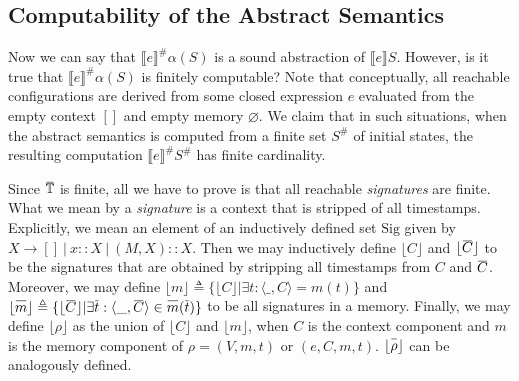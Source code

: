 \documentclass{article}
\theoremstyle{definition}
\def\ovbarw{1.2mu}
\def\ovbarh{1}
\newcommand*{\ovbar}[1]{\mkern \ovbarw\overline{\mkern-\ovbarw{\smash{#1}\scalebox{1}[\ovbarh]{\vphantom{i}}}\mkern-\ovbarw}\mkern \ovbarw}
\newcommand*{\A}[1]{\ovbar{#1}}
\newcommand*{\Abs}[1]{{#1}^{\#}}
\newcommand*{\Time}{\mathbb{T}}
\newcommand*{\ATime}{\A{\Time}}
\newcommand*{\Sig}{\text{Sig}}
\newcommand*{\mem}{m}
\newcommand*{\sembracket}[1]{\lBrack{#1}\rBrack}
\begin{document}
\subsection{Computability of the Abstract Semantics}
Now we can say that $\Abs{\sembracket{e}}\alpha(S)$ is a sound abstraction of $\sembracket{e}S$.
However, is it true that $\Abs{\sembracket{e}}\alpha(S)$ is finitely computable?
Note that conceptually, all reachable configurations are derived from some closed expression $e$ evaluated from the empty context $[]$ and empty memory $\varnothing$.
We claim that in such situations, when the abstract semantics is computed from a finite set $\Abs{S}$ of initial states, the resulting computation $\Abs{\sembracket{e}}\Abs{S}$ has finite cardinality.

Since $\ATime$ is finite, all we have to prove is that all reachable \emph{signatures} are finite.
What we mean by a \emph{signature} is a context that is stripped of all timestamps.
Explicitly, we mean an element of an inductively defined set $\Sig$ given by $X\rightarrow []\:|\:x::X\:|\:(M,X)::X$.
Then we may inductively define $\lfloor C\rfloor$ and $\lfloor \A{C}\rfloor$ to be the signatures that are obtained by stripping all timestamps from $C$ and $\A{C}$.
Moreover, we may define $\lfloor m\rfloor\triangleq\{\lfloor C\rfloor|\exists t:\langle\_,C\rangle=m(t)\}$ and $\lfloor\A{m}\rfloor\triangleq\{\lfloor\A{C}\rfloor|\exists\A{t}:\langle\_,\A{C}\rangle\in\A{m}(\A{t})\}$ to be all signatures in a memory.
Finally, we may define $\lfloor\rho\rfloor$ as the union of $\lfloor C\rfloor$ and $\lfloor m\rfloor$, when $C$ is the context component and $m$ is the memory component of $\rho=(V,\mem,t)$ or $(e,C,\mem,t)$.
$\lfloor\A\rho\rfloor$ can be analogously defined.
\end{document}
